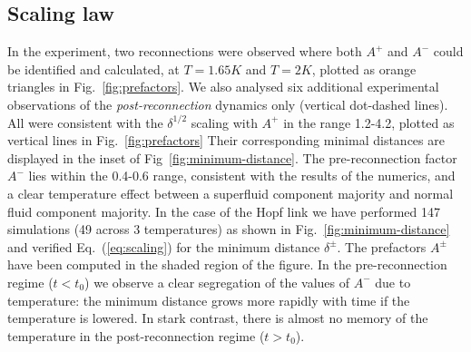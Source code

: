 \documentclass[9pt,twocolumn,twoside]{pnas-new}
\def\red#1{\textcolor{red}{#1}}
\begin{document}
\subsection*{Scaling law}

In the experiment, two reconnections were observed where both $A^+$ and $A^-$ could be identified and calculated, at $T=1.65K$ and $T=2K$, plotted as orange triangles in Fig.~\ref{fig:prefactors}. We also analysed six additional experimental observations of the \emph{post-reconnection} dynamics only (vertical dot-dashed lines). All were consistent with the $\delta^{1/2}$ scaling with $A^+$ in the range 1.2-4.2, plotted as vertical lines in Fig.~\ref{fig:prefactors} Their corresponding minimal distances are displayed in the inset of Fig~\ref{fig:minimum-distance}.
%
The pre-reconnection factor $A^-$ lies within the 0.4-0.6 range, consistent with the results of the numerics, and a clear temperature effect between a superfluid component majority and normal fluid component majority.
In the case of the Hopf link 
we have performed 147 simulations 
(49 across 3 temperatures) as shown in Fig.~\ref{fig:minimum-distance} and
verified Eq.~(\ref{eq:scaling}) for the minimum distance $\delta^{\pm}$. 
The prefactors $A^{\pm}$ have been computed in the shaded region 
of the figure. In the pre-reconnection regime ($t<t_0$) we observe
a clear segregation of the values of $A^-$ due to temperature: 
the minimum distance grows more rapidly with time if the temperature is
lowered. 
In stark contrast, there is almost no memory of the temperature in the
post-reconnection regime ($t>t_0$). 
\end{document}
